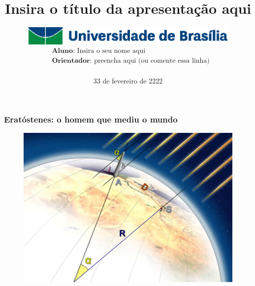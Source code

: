 \documentclass{beamer}
\date{33 de fevereiro de 2222}
\title[Apresentação sobre...]{Insira o título da apresentação aqui} %
\author[Neumann, V.]{\includegraphics[width=0.8\textwidth]{unb.eps} \\  \[ \begin{aligned}
&\textbf{Aluno:} \text{ Insira o seu nome aqui} \\
&\textbf{Orientador:} \text{ preencha aqui (ou comente essa linha)} \\
\end{aligned}
\] }
\begin{document}
\begin{frame}
\titlepage %
\end{frame}






\begin{frame}
\frametitle{Eratóstenes: o homem que mediu o mundo}
\begin{figure}[H]
\centering
\includegraphics[scale=.35]{./IMAGES/erast.jpg}
\end{figure}
\end{frame}
\end{document}
